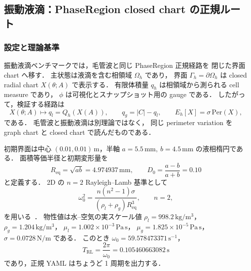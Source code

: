 \subsection{振動液滴：PhaseRegion closed chart の正規ルート}
\label{sec:val_oscillating_droplet}

\subsubsection{設定と理論基準}

振動液滴ベンチマークでは，毛管波と同じ PhaseRegion 正規経路を
閉じた界面 chart へ移す．
主状態は液滴を含む相領域 $\Omega_h$ であり，
界面 $\Gamma_h=\partial\Omega_h$ は closed radial chart
$X(\theta;A)$ で表示する．
有限体積量 $q_h$ は相領域から測られる cell measure であり，
$\phi$ は可視化とスナップショット用の gauge である．
したがって，検証する経路は
\begin{equation}
  X(\theta;A)
  \longmapsto q_l=Q_h(X(A)),
  \qquad
  q_g=|C|-q_l,
  \qquad
  E_h[X]=\sigma\,\mathrm{Per}(X),
  \label{eq:phase_region_droplet_route}
\end{equation}
である．
毛管波と振動液滴は別理論ではなく，
同じ perimeter variation を graph chart と closed chart で読んだものである．

初期界面は中心 $(0.01,0.01)\,\mathrm{m}$，半軸
$a=5.5\,\mathrm{mm},\ b=4.5\,\mathrm{mm}$ の液相楕円である．
面積等価半径と初期変形量を
\begin{equation}
  R_{\mathrm{eq}}=\sqrt{ab}=4.974937\,\mathrm{mm},
  \qquad
  D_0=\frac{a-b}{a+b}=0.10
  \label{eq:oscillating_droplet_initial}
\end{equation}
と定義する．
2D の $n=2$ Rayleigh--Lamb 基準として
\begin{equation}
  \omega_0^2
  = \frac{n(n^2-1)\sigma}{(\rho_l+\rho_g)R_{\mathrm{eq}}^3},
  \qquad n=2,
  \label{eq:oscillating_droplet_lamb}
\end{equation}
を用いる~\cite{Prosperetti1981}．
物性値は水--空気の実スケール値
$\rho_l=998.2\,\mathrm{kg/m^3}$，
$\rho_g=1.204\,\mathrm{kg/m^3}$，
$\mu_l=1.002\times10^{-3}\,\mathrm{Pa\,s}$，
$\mu_g=1.825\times10^{-5}\,\mathrm{Pa\,s}$，
$\sigma=0.0728\,\mathrm{N/m}$ である．
このとき $\omega_0=59.578473371\,\mathrm{s^{-1}}$，
\[
  T_\mathrm{RL}=\frac{2\pi}{\omega_0}=0.105460663082\,\mathrm{s}
\]
であり，正規 YAML はちょうど 1 周期を出力する．

